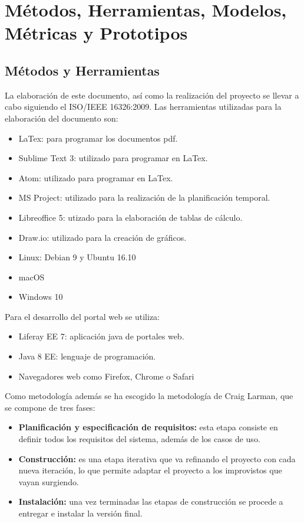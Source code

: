 \section{Métodos, Herramientas, Modelos, Métricas y Prototipos}
\subsection{Métodos y Herramientas}
\par La elaboración de este documento, así como la realización del proyecto se llevar a cabo siguiendo el ISO/IEEE 16326:2009. Las herramientas utilizadas para la elaboración del documento son:
\begin{itemize}
 	\item LaTex: para programar los documentos pdf.
 	\item Sublime Text 3: utilizado para programar en LaTex.
 	\item Atom: utilizado para programar en LaTex.
 	\item MS Project: utilizado para la realización de la planificación temporal.
 	\item Libreoffice 5: utizado para la elaboración de tablas de cálculo.
 	\item Draw.io: utilizado para la creación de gráficos.
 	\item Linux: Debian 9 y Ubuntu 16.10
 	\item macOS
 	\item Windows 10
 \end{itemize}
 \par Para el desarrollo del portal web se utiliza:
 \begin{itemize}
 	\item Liferay EE 7: aplicación java de portales web.
 	\item Java 8 EE: lenguaje de programación.
 	\item Navegadores web como Firefox, Chrome o Safari
 \end{itemize}

 \par Como metodología además se ha escogido la metodología de Craig Larman, que se compone de tres fases:
 \begin{itemize}
 	\item \textbf{Planificación y especificación de requisitos:} esta etapa consiste en definir todos los requisitos del sistema, además de los casos de uso.
 	\item \textbf{Construcción:} es una etapa iterativa que va refinando el proyecto con cada nueva iteración, lo que permite adaptar el proyecto a los improvistos que vayan surgiendo.
 	\item \textbf{Instalación:} una vez terminadas las etapas de construcción se procede a entregar e instalar la versión final.
 \end{itemize}


